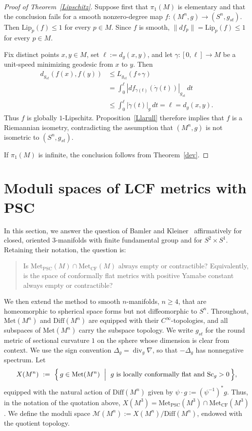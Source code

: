 \documentclass[12pt,oneside,a4paper]{article}
\theoremstyle{mytheorem}
\theoremstyle{remark}
\theoremstyle{definition}
\begin{document}
\begin{proof}[Proof of Theorem~\ref{Lipschitz}]
Suppose first that $\pi_1(M)$ is elementary and that the conclusion
fails for a smooth nonzero-degree map
\(f\colon(M^n,g)\to(S^n,g_{st})\). Then
$\mathrm{Lip}_p(f)\leq1$ for every $p\in M$. Since $f$ is smooth,
\(\|df_p\|=\mathrm{Lip}_p(f)\leq1\)
for every \(p\in M\).

Fix distinct points \(x,y\in M\), set \(\ell:=d_g(x,y)\), and let
\(\gamma\colon[0,\ell]\to M\) be a unit-speed minimizing geodesic from
\(x\) to \(y\). Then
\[
\begin{aligned}
d_{g_{st}}(f(x),f(y))
&\leq L_{g_{st}}(f\circ\gamma)\\
&=\int_0^\ell |df_{\gamma(t)}(\dot\gamma(t))|_{g_{st}}\,dt\\
&\leq\int_0^\ell |\dot\gamma(t)|_g\,dt
=\ell=d_g(x,y).
\end{aligned}
\]
Thus $f$ is globally $1$-Lipschitz. Proposition~\ref{Llarull} therefore
implies that $f$ is a Riemannian isometry, contradicting the assumption
that $(M^n,g)$ is not
isometric to $(S^n,g_{st})$.

If $\pi_1(M)$  is infinite,  the conclusion follows from
Theorem~\ref{dev}.
\end{proof}




\section{Moduli spaces of LCF metrics with PSC}\label{5}
In this section, we answer the question of Bamler and
Kleiner~\cite[Question~1.8]{2019arXiv190908710B} affirmatively for closed,
oriented $3$-manifolds with finite fundamental group and for
$S^2\times S^1$. Retaining their notation, the question is:
\begin{quote}
Is $\mathrm{Met}_{\mathrm{PSC}}(M) \cap \mathrm{Met}_{\mathrm{CF}}(M)$ always empty or contractible?
Equivalently, is the space of conformally flat metrics with positive Yamabe constant
always empty or contractible?
\end{quote}
We then extend the method to smooth $n$-manifolds, $n\ge4$, that are
homeomorphic to spherical space forms but not diffeomorphic to $S^n$.
Throughout, $\mathrm{Met}(M^n)$ and $\mathrm{Diff}(M^n)$ are equipped with
their $C^\infty$-topologies, and all subspaces of $\mathrm{Met}(M^n)$ carry
the subspace topology. We write $g_{st}$ for the round metric of sectional
curvature $1$ on the sphere whose dimension is clear from context. We use the
sign convention
\(\Delta_g=\operatorname{div}_g\nabla\),
so that $-\Delta_g$ has nonnegative spectrum. Let
\[
X(M^n) \ :=\ \Bigl\{\, g \in \mathrm{Met}(M^n) \ \Bigm| \ g \text{ is locally conformally flat and } \mathrm{Sc}_g > 0 \,\Bigr\},
\]
equipped with the natural action of $\mathrm{Diff}(M^n)$ given by
$\psi\cdot g:=(\psi^{-1})^*g$. Thus, in the notation of the quotation above,
$X(M^3)
=
\mathrm{Met}_{\mathrm{PSC}}(M^3)
\cap
\mathrm{Met}_{\mathrm{CF}}(M^3)$.
We define the moduli space
$\mathcal{M}(M^n) := X(M^n) / \mathrm{Diff}(M^n)$, endowed with the quotient topology.
\end{document}

